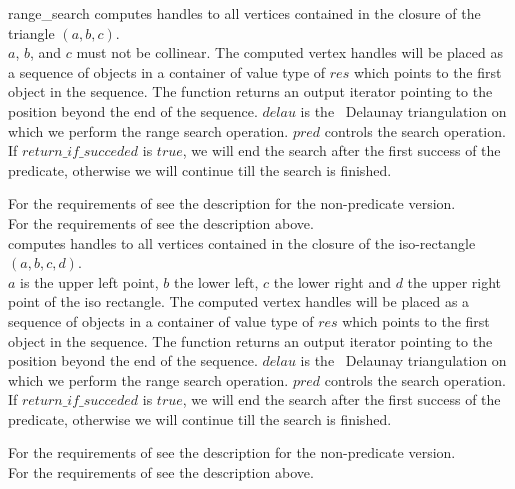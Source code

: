 \begin{ccRefFunction}{range_search}
{computes handles to all vertices contained in the closure of the triangle $(a,b,c)$.\\
\ccPrecond $a$, $b$, and $c$ must not be collinear. 
The computed vertex handles will be placed as a sequence of objects in a container of value type
of $res$
which points to the first object in the sequence. The function
returns an output iterator pointing to the position beyond the end
of the sequence. 
$delau$ is the \cgal\ Delaunay triangulation on which we perform the range search operation.
$pred$ controls the search operation. If $return\_if\_succeded$ is $true$, we will end the search
after the first success of the predicate, otherwise we will continue till the search is finished.}

For the requirements of  see the description for the non-predicate version.\\
For the requirements of  see the description above. \\

{computes handles to all vertices contained in the closure of the iso-rectangle $(a,b,c,d)$.\\
\ccPrecond $a$ is the upper left point, $b$ the lower left, $c$ the lower
right and $d$ the upper right point of the iso rectangle.
The computed vertex handles will be placed as a sequence of objects in a container of value type
of $res$
which points to the first object in the sequence. The function
returns an output iterator pointing to the position beyond the end
of the sequence. $delau$ is the \cgal\ Delaunay triangulation on which we perform the range search operation.
$pred$ controls the search operation. If $return\_if\_succeded$ is $true$, we will end the search
after the first success of the predicate, otherwise we will continue till the search is finished.} 

For the requirements of  see the description for the non-predicate version.\\
For the requirements of  see the description above. \\

\end{ccRefFunction}


